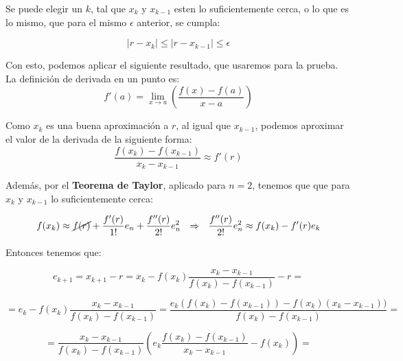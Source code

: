 \documentclass[11pt, a4paper]{exam}
\providecommand{\abs}[1]{\lvert#1\rvert}
\begin{document}
\begin{questions}
\begin{parts}
\begin{solution}
            Se puede elegir un $k$, tal que $x_k$ y $x_{k-1}$ esten lo suficientemente cerca, o lo que es lo mismo, que para el mismo $\epsilon$ anterior, se cumpla: 

            \begin{equation*}
                \abs{r - x_k} \leq \abs{r - x_{k-1}} \leq \epsilon
            \end{equation*}

            Con esto, podemos aplicar el siguiente resultado, que usaremos para la prueba. La definición de derivada en un punto es: 
            \begin{equation*}
                f'(a) = \lim_{x \to a}\left(\frac{f(x) - f(a)}{x-a}\right)
            \end{equation*}

            Como $x_k$ es una buena aproximación a $r$, al igual que $x_{k-1}$, podemos aproximar el valor de la derivada de la siguiente forma:
            \begin{equation*}
                \frac{f(x_k) - f(x_{k-1})}{x_k - x_{k-1}} \approx f'(r)
            \end{equation*}

            Además, por el \textbf{Teorema de Taylor}, aplicado para $n =2$, tenemos que que para $x_k$ y $x_{k-1}$ lo suficientemente cerca: 

            \begin{equation*}
                f(x_k) \approx \cancel{f(r)} + \frac{f'(r)}{1!}e_n + \frac{f''(r)}{2!}e_n^2 \ \ \Rightarrow \ \ \frac{f''(r)}{2!}e_n^2 \approx f(x_k) - f'(r)e_k
            \end{equation*}

            Entonces tenemos que: 
            
            \begin{equation*}
                e_{k+1} = x_{k+1} - r = x_k - f(x_k)\frac{x_k - x_{k-1}}{f(x_k) - f(x_{k-1})} - r = 
            \end{equation*}

            \begin{equation*}
                = e_k - f(x_k)\frac{x_k - x_{k-1}}{f(x_k) - f(x_{k-1})} = \frac{e_k(f(x_k) - f(x_{k-1})) - f(x_k)(x_k-x_{k-1}))}{f(x_k) - f(x_{k-1})} = 
            \end{equation*}

            \begin{equation*}
                = \frac{x_k - x_{k-1}}{f(x_k) - f(x_{k-1})} \left(e_k\frac{f(x_k) - f(x_{k-1})}{x_k - x_{k-1}} - f(x_k) \right) = 
            \end{equation*}


\end{solution}
\end{parts}
\end{questions}
\end{document}
